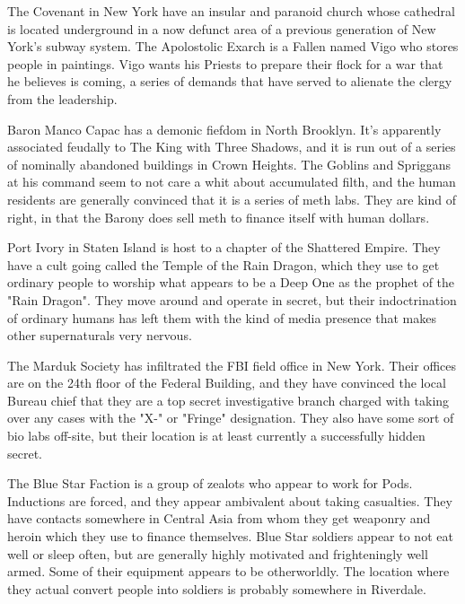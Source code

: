 The Covenant in New York have an insular and paranoid church whose cathedral is located underground in a now defunct area of a previous generation of New York's subway system. The Apolostolic Exarch is a Fallen named Vigo who stores people in paintings. Vigo wants his Priests to prepare their flock for a war that he believes is coming, a series of demands that have served to alienate the clergy from the leadership.

Baron Manco Capac has a demonic fiefdom in North Brooklyn. It's apparently associated feudally to The King with Three Shadows, and it is run out of a series of nominally abandoned buildings in Crown Heights. The Goblins and Spriggans at his command seem to not care a whit about accumulated filth, and the human residents are generally convinced that it is a series of meth labs. They are kind of right, in that the Barony does sell meth to finance itself with human dollars.

Port Ivory in Staten Island is host to a chapter of the Shattered Empire. They have a cult going called the Temple of the Rain Dragon, which they use to get ordinary people to worship what appears to be a Deep One as the prophet of the "Rain Dragon". They move around and operate in secret, but their indoctrination of ordinary humans has left them with the kind of media presence that makes other supernaturals very nervous.

The Marduk Society has infiltrated the FBI field office in New York. Their offices are on the 24th floor of the Federal Building, and they have convinced the local Bureau chief that they are a top secret investigative branch charged with taking over any cases with the "X-" or "Fringe" designation. They also have some sort of bio labs off-site, but their location is at least currently a successfully hidden secret.

The Blue Star Faction is a group of zealots who appear to work for Pods. Inductions are forced, and they appear ambivalent about taking casualties. They have contacts somewhere in Central Asia from whom they get weaponry and heroin which they use to finance themselves. Blue Star soldiers appear to not eat well or sleep often, but are generally highly motivated and frighteningly well armed. Some of their equipment appears to be otherworldly. The location where they actual convert people into soldiers is probably somewhere in Riverdale.

